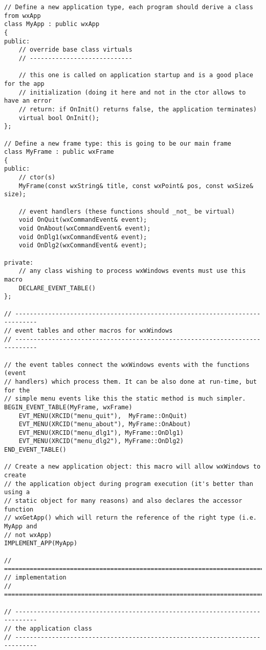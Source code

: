 \begin{verbatim}
// Define a new application type, each program should derive a class from wxApp
class MyApp : public wxApp
{
public:
    // override base class virtuals
    // ----------------------------

    // this one is called on application startup and is a good place for the app
    // initialization (doing it here and not in the ctor allows to have an error
    // return: if OnInit() returns false, the application terminates)
    virtual bool OnInit();
};

// Define a new frame type: this is going to be our main frame
class MyFrame : public wxFrame
{
public:
    // ctor(s)
    MyFrame(const wxString& title, const wxPoint& pos, const wxSize& size);

    // event handlers (these functions should _not_ be virtual)
    void OnQuit(wxCommandEvent& event);
    void OnAbout(wxCommandEvent& event);
    void OnDlg1(wxCommandEvent& event);
    void OnDlg2(wxCommandEvent& event);

private:
    // any class wishing to process wxWindows events must use this macro
    DECLARE_EVENT_TABLE()
};

// ----------------------------------------------------------------------------
// event tables and other macros for wxWindows
// ----------------------------------------------------------------------------

// the event tables connect the wxWindows events with the functions (event
// handlers) which process them. It can be also done at run-time, but for the
// simple menu events like this the static method is much simpler.
BEGIN_EVENT_TABLE(MyFrame, wxFrame)
    EVT_MENU(XRCID("menu_quit"),  MyFrame::OnQuit)
    EVT_MENU(XRCID("menu_about"), MyFrame::OnAbout)
    EVT_MENU(XRCID("menu_dlg1"), MyFrame::OnDlg1)
    EVT_MENU(XRCID("menu_dlg2"), MyFrame::OnDlg2)
END_EVENT_TABLE()

// Create a new application object: this macro will allow wxWindows to create
// the application object during program execution (it's better than using a
// static object for many reasons) and also declares the accessor function
// wxGetApp() which will return the reference of the right type (i.e. MyApp and
// not wxApp)
IMPLEMENT_APP(MyApp)

// ============================================================================
// implementation
// ============================================================================

// ----------------------------------------------------------------------------
// the application class
// ----------------------------------------------------------------------------


\end{verbatim}
